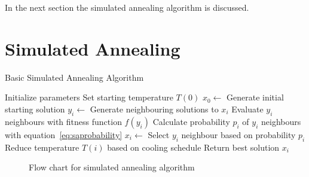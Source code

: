 In the next section the simulated annealing algorithm is discussed.
\section{Simulated Annealing}
\label{sec:simulatedannealing}
\begin{algorithm}
\caption{Basic Simulated Annealing Algorithm\cite{VeryFastSAImageEnchancement,ChaosSA}}
\label{alg:SA}
	\begin{algorithmic}[1]
		\STATE Initialize parameters
		\STATE Set starting temperature $T(0)$
		\STATE $x_0 \leftarrow$ Generate initial starting solution
			\STATE $y_i \leftarrow$ Generate neighbouring solutions to $x_i$
			\STATE Evaluate $y_i$ neighbours with fitness function $f(y_i)$
			\STATE Calculate probability $p_i$ of $y_i$ neighbours with equation~\ref{eq:saprobability}
			\STATE $x_i \leftarrow$ Select $y_i$ neighbour based on probability $p_i$
			\STATE Reduce temperature $T(i)$ based on cooling schedule
		\ENDWHILE
		\STATE Return best solution $x_i$
	\end{algorithmic}
\end{algorithm}
\begin{figure}[htbp!]
	\begin{center}
	\caption{Flow chart for simulated annealing algorithm}
	\label{fig:SimulatedAnnealingFlowChart}
	\end{center}
\end{figure}
